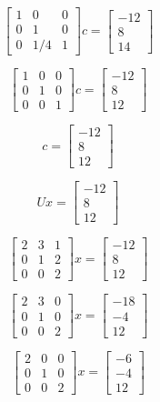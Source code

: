 \documentclass[12pt]{article}
\theoremstyle{homework}
\begin{document}
$$\begin{bmatrix}
1&0&0\\
0&1&0\\
0&1/4&1
\end{bmatrix}
c=\begin{bmatrix}
-12\\
8\\
14
\end{bmatrix}$$

$$\begin{bmatrix}
1&0&0\\
0&1&0\\
0&0&1
\end{bmatrix}
c=\begin{bmatrix}
-12\\
8\\
12
\end{bmatrix}$$

$$
c=\begin{bmatrix}
-12\\
8\\
12
\end{bmatrix}$$

$$
Ux=\begin{bmatrix}
-12\\
8\\
12
\end{bmatrix}$$

$$
\begin{bmatrix}
2&3&1\\
0&1&2\\
0&0&2
\end{bmatrix}
x=\begin{bmatrix}
-12\\
8\\
12
\end{bmatrix}$$

$$
\begin{bmatrix}
2&3&0\\
0&1&0\\
0&0&2
\end{bmatrix}
x=\begin{bmatrix}
-18\\
-4\\
12
\end{bmatrix}$$

$$
\begin{bmatrix}
2&0&0\\
0&1&0\\
0&0&2
\end{bmatrix}
x=\begin{bmatrix}
-6\\
-4\\
12
\end{bmatrix}$$
\end{document}
